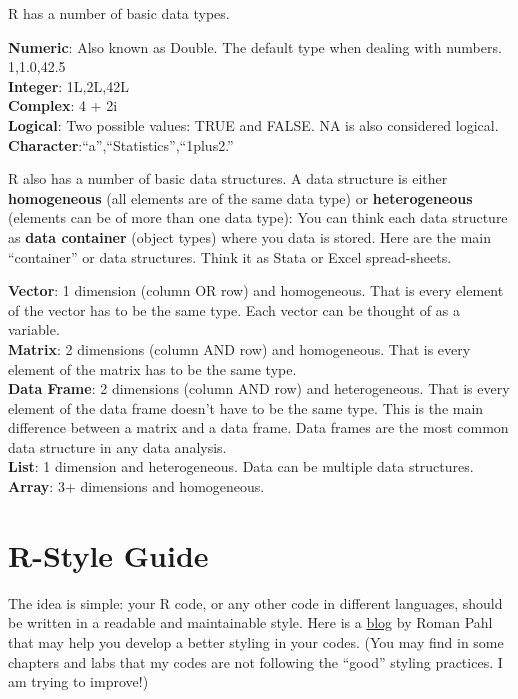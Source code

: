 \documentclass[
]{book}
\theoremstyle{definition}
\theoremstyle{definition}
\theoremstyle{definition}
\theoremstyle{definition}
\theoremstyle{remark}
\begin{document}
R has a number of basic data types.

\textbf{Numeric}: Also known as Double. The default type when dealing with numbers. 1,1.0,42.5\\
\textbf{Integer}: 1L,2L,42L\\
\textbf{Complex}: 4 + 2i\\
\textbf{Logical}: Two possible values: TRUE and FALSE. NA is also considered logical.\\
\textbf{Character}:``a'',``Statistics'',``1plus2.''

R also has a number of basic data structures. A data structure is either \textbf{homogeneous} (all elements are of the same data type) or \textbf{heterogeneous} (elements can be of more than one data type): You can think each data structure as \textbf{data container} (object types) where you data is stored. Here are the main ``container'' or data structures. Think it as Stata or Excel spread-sheets.

\textbf{Vector}: 1 dimension (column OR row) and homogeneous. That is every element of the vector has to be the same type. Each vector can be thought of as a variable.\\
\textbf{Matrix}: 2 dimensions (column AND row) and homogeneous. That is every element of the matrix has to be the same type.\\
\textbf{Data Frame}: 2 dimensions (column AND row) and heterogeneous. That is every element of the data frame doesn't have to be the same type. This is the main difference between a matrix and a data frame. Data frames are the most common data structure in any data analysis.\\
\textbf{List}: 1 dimension and heterogeneous. Data can be multiple data structures.\\
\textbf{Array}: 3+ dimensions and homogeneous.

\hypertarget{r-style-guide}{%
\section{R-Style Guide}\label{r-style-guide}}

The idea is simple: your R code, or any other code in different languages, should be written in a readable and maintainable style. Here is a \href{https://rpahl.github.io/r-some-blog/r-style-guide/}{blog} by Roman Pahl that may help you develop a better styling in your codes. (You may find in some chapters and labs that my codes are not following the ``good'' styling practices. I am trying to improve!)
\end{document}
